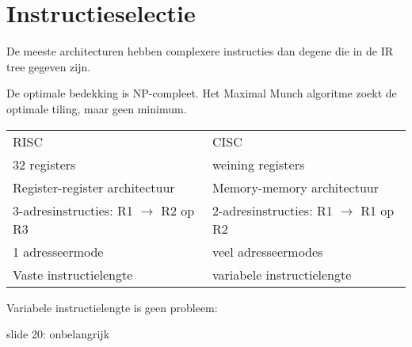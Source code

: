 \chapter{Instructieselectie}

De meeste architecturen hebben complexere instructies dan degene die in de IR tree gegeven zijn.

De optimale bedekking is NP-compleet. Het Maximal Munch algoritme zoekt de optimale tiling, maar geen minimum.



\begin{table}
	\begin{tabular}{l | l}
		RISC & CISC \\
		32 registers & weining registers \\
		Register-register architectuur & Memory-memory architectuur \\
		3-adresinstructies: R1 $\rightarrow$ R2 op R3 & 2-adresinstructies: R1 $\rightarrow$ R1 op R2 \\
		1 adresseermode & veel adresseermodes \\
		Vaste instructielengte & variabele instructielengte \\
	\end{tabular}
\end{table}


Variabele instructielengte is geen probleem:

slide 20: onbelangrijk